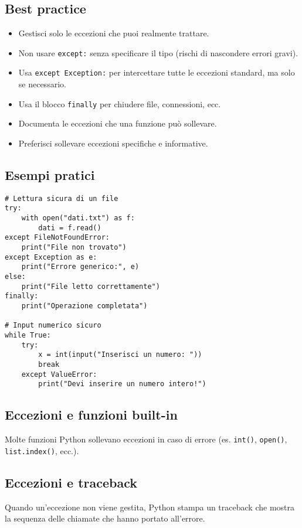 \documentclass[a4paper,12pt]{article}
\begin{document}
\subsection*{Best practice}
\begin{itemize}
    \item Gestisci solo le eccezioni che puoi realmente trattare.
    \item Non usare \texttt{except:} senza specificare il tipo (rischi di nascondere errori gravi).
    \item Usa \texttt{except Exception:} per intercettare tutte le eccezioni standard, ma solo se necessario.
    \item Usa il blocco \texttt{finally} per chiudere file, connessioni, ecc.
    \item Documenta le eccezioni che una funzione può sollevare.
    \item Preferisci sollevare eccezioni specifiche e informative.
\end{itemize}

\subsection*{Esempi pratici}
\begin{lstlisting}
# Lettura sicura di un file
try:
    with open("dati.txt") as f:
        dati = f.read()
except FileNotFoundError:
    print("File non trovato")
except Exception as e:
    print("Errore generico:", e)
else:
    print("File letto correttamente")
finally:
    print("Operazione completata")

# Input numerico sicuro
while True:
    try:
        x = int(input("Inserisci un numero: "))
        break
    except ValueError:
        print("Devi inserire un numero intero!")
\end{lstlisting}

\subsection*{Eccezioni e funzioni built-in}
Molte funzioni Python sollevano eccezioni in caso di errore (es. \texttt{int()}, \texttt{open()}, \texttt{list.index()}, ecc.).

\subsection*{Eccezioni e traceback}
Quando un'eccezione non viene gestita, Python stampa un traceback che mostra la sequenza delle chiamate che hanno portato all'errore.
\end{document}
